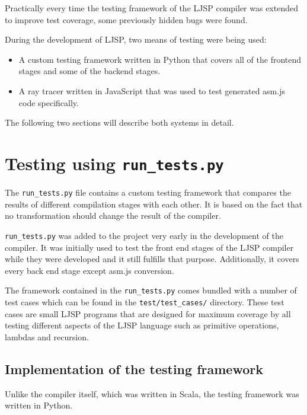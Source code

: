 \documentclass[11pt]{report}
\begin{document}
Practically every time the testing framework of the LJSP compiler was extended to improve test coverage, some previously hidden bugs were found.

During the development of LJSP, two means of testing were being used:
\begin{itemize}
\item A custom testing framework written in Python that covers all of the frontend stages and some of the backend stages.
\item A ray tracer written in JavaScript that was used to test generated asm.js code specifically.
\end{itemize}
The following two sections will describe both systems in detail.


\section{Testing using \texttt{run_tests.py}}
The \texttt{run_tests.py} file contains a custom testing framework that compares the results of different compilation stages with each other. It is based on the fact that no transformation should change the result of the compiler.

\texttt{run_tests.py} was added to the project very early in the development of the compiler. It was initially used to test the front end stages of the LJSP compiler while they were developed and it still fulfills that purpose. Additionally, it covers every back end stage except asm.js conversion.

The framework contained in the \texttt{run_tests.py} comes bundled with a number of test cases which can be found in the \texttt{test/test_cases/} directory. These test cases are small LJSP programs that are designed for maximum coverage by all testing different aspects of the LJSP language such as primitive operations, lambdas and recursion.

\subsection{Implementation of the testing framework}
Unlike the compiler itself, which was written in Scala, the testing framework was written in Python. 

\end{document}
